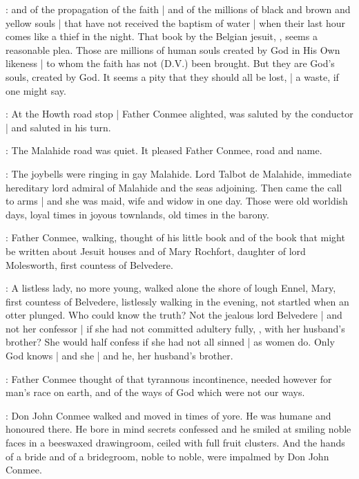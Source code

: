 \conmeeint:
and of the propagation of the faith |
and of the millions of black and brown and yellow souls |
that have not received the baptism of water |
when their last hour comes like a thief in the night.
That book by the Belgian jesuit,
,
seems a reasonable plea.
Those are millions of human souls created by God in His Own likeness |
to whom the faith has not (D.V.) been brought.
But they are God's souls, created by God.
It seems a pity that they should all be lost, |
a waste, if one might say.

:
At the Howth road stop |
Father Conmee alighted,
was saluted by the conductor |
and saluted in his turn.

:
The Malahide road was quiet.
It pleased Father Conmee, road and name.

\conmeeint:
The joybells were ringing in gay Malahide.
Lord Talbot de Malahide,
immediate hereditary lord admiral of Malahide and the seas adjoining.
Then came the call to arms |
and she was maid, wife and widow in one day.
Those were old worldish days,
loyal times in joyous townlands,
old times in the barony.%

:
Father Conmee, walking, thought of his little book
and of the book that might be written about Jesuit houses
and of Mary Rochfort,
daughter of lord Molesworth,
first countess of Belvedere.

\conmeeint:
A listless lady, no more young,
walked alone the shore of lough Ennel,
Mary, first countess of Belvedere,
listlessly walking in the evening,
not startled when an otter plunged.
Who could know the truth?
Not the jealous lord Belvedere |
and not her confessor |
if she had not committed adultery fully,
,
with her husband's brother?
She would half confess if she had not all sinned |
as women do.
Only God knows |
and she |
and he, her husband's brother.

:
Father Conmee thought of that tyrannous incontinence,
needed however for man's race on earth,
and of the ways of God which were not our ways.

:
Don John Conmee walked and moved in times of yore.
He was humane and honoured there.
He bore in mind secrets confessed
and he smiled at smiling noble faces in a beeswaxed drawingroom,
ceiled with full fruit clusters.
And the hands of a bride and of a bridegroom,
noble to noble,
were impalmed by Don John Conmee.

